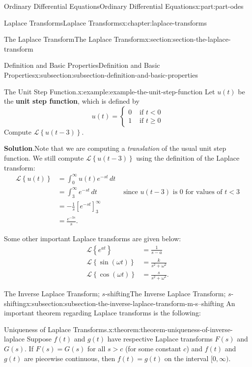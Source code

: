 \documentclass[twoside,10pt,]{book}
\newcommand{\blocktitlefont}{\relax}
\newcommand{\terminology}[1]{\textbf{#1}}
\numberwithin{equation}{part}
\newcommand{\Int}[2]{\int_{#1}^{#2}}
\newcommand{\Laplace}[1]{\mathcal{L}\left\{#1\right\}}
\newcommand{\lt}{<}
\newcommand{\gt}{>}
\newcommand{\amp}{&}
\begin{document}
\begin{partptx}{Ordinary Differential Equations}{}{Ordinary Differential Equations}{}{}{x:part:part-odes}
\begin{chapterptx}{Laplace Transforms}{}{Laplace Transforms}{}{}{x:chapter:laplace-transforms}
\begin{sectionptx}{The Laplace Transform}{}{The Laplace Transform}{}{}{x:section:section-the-laplace-transform}
\begin{subsectionptx}{Definition and Basic Properties}{}{Definition and Basic Properties}{}{}{x:subsection:subsection-definition-and-basic-properties}
\begin{example}{The Unit Step Function.}{x:example:example-the-unit-step-function}%
Let \(u(t)\) be the \terminology{unit step function}, which is defined by%
\begin{equation*}
u(t) = 
\begin{cases}
0 \amp\text{ if } t\lt 0  \\
1 \amp\text{ if } t\geq0
\end{cases}
\end{equation*}
Compute \(\Laplace{u(t-3)}\).%
\par\smallskip%
\noindent\textbf{\blocktitlefont Solution}.\hypertarget{g:solution:idp105548816600608}{}\quad{}Note that we are computing a \emph{translation} of the usual unit step function. We still compute \(\Laplace{u(t-3)}\) using the definition of the Laplace transform:%
\begin{align*}
\Laplace{u(t)} \amp= \Int{0}{\infty}u(t)e^{-st}\,dt\\
\amp= \Int{3}{\infty}e^{-st}\,dt \amp\text{ since }u(t-3) \text{ is }0 \text{ for values of }t\lt3\\
\amp= -\frac{1}{s}\left[e^{-st}\right]_{3}^{\infty}\\
\amp= \frac{e^{-3s}}{s}\text{.}
\end{align*}
%
\end{example}
Some other important Laplace transforms are given below:%
\begin{align*}
\Laplace{e^{at}} \amp= \frac{1}{s-a}\\
\Laplace{\sin(\omega t)} \amp= \frac{k}{s^{2}+\omega^{2}}\\
\Laplace{\cos(\omega t)} \amp= \frac{s}{s^{2}+\omega^{2}}\text{.}
\end{align*}
%
\end{subsectionptx}
%
%
\typeout{************************************************}
\typeout{************************************************}
%
\begin{subsectionptx}{The Inverse Laplace Transform; \(s\)-shifting}{}{The Inverse Laplace Transform; \(s\)-shifting}{}{}{x:subsection:subsection-the-inverse-laplace-transform-m-s--shifting}
An important theorem regarding Laplace transforms is the following:%
\begin{theorem}{Uniqueness of Laplace Transforms.}{}{x:theorem:theorem-uniqueness-of-inverse-laplace}%
Suppose \(f(t)\) and \(g(t)\) have respective Laplace transforms \(F(s)\) and \(G(s)\). If \(F(s) = G(s)\) for all \(s\gt c\) (for some constant \(c\)) and \(f(t)\) and \(g(t)\) are piecewise continuous, then \(f(t) = g(t)\) on the interval \([0,\infty)\).%

\end{theorem}
\end{subsectionptx}
\end{sectionptx}
\end{chapterptx}
\end{partptx}
\end{document}
